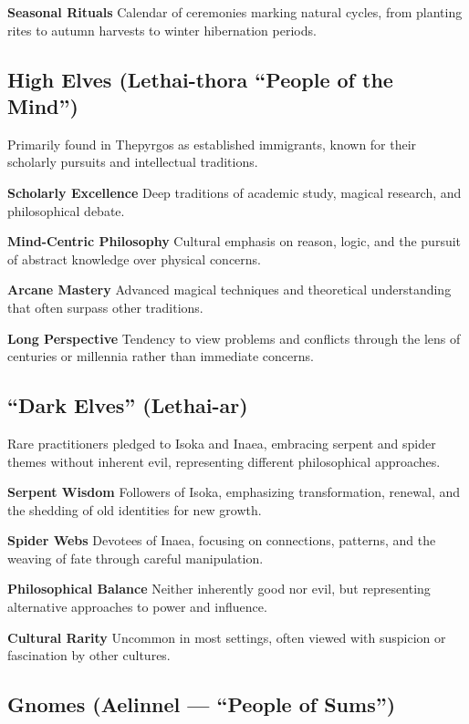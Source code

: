 \documentclass[11pt,twoside,openany]{book}
\begin{document}
\textbf{Seasonal Rituals} Calendar of ceremonies marking natural cycles, from planting rites to autumn harvests to winter hibernation periods.

\subsection*{High Elves (Lethai-thora ``People of the Mind'')}

Primarily found in Thepyrgos as established immigrants, known for their scholarly pursuits and intellectual traditions.

\textbf{Scholarly Excellence} Deep traditions of academic study, magical research, and philosophical debate.

\textbf{Mind-Centric Philosophy} Cultural emphasis on reason, logic, and the pursuit of abstract knowledge over physical concerns.

\textbf{Arcane Mastery} Advanced magical techniques and theoretical understanding that often surpass other traditions.

\textbf{Long Perspective} Tendency to view problems and conflicts through the lens of centuries or millennia rather than immediate concerns.

\subsection*{``Dark Elves'' (Lethai-ar)}

Rare practitioners pledged to Isoka and Inaea, embracing serpent and spider themes without inherent evil, representing different philosophical approaches.

\textbf{Serpent Wisdom} Followers of Isoka, emphasizing transformation, renewal, and the shedding of old identities for new growth.

\textbf{Spider Webs} Devotees of Inaea, focusing on connections, patterns, and the weaving of fate through careful manipulation.

\textbf{Philosophical Balance} Neither inherently good nor evil, but representing alternative approaches to power and influence.

\textbf{Cultural Rarity} Uncommon in most settings, often viewed with suspicion or fascination by other cultures.

\subsection*{Gnomes (Aelinnel --- ``People of Sums'')}
\end{document}
